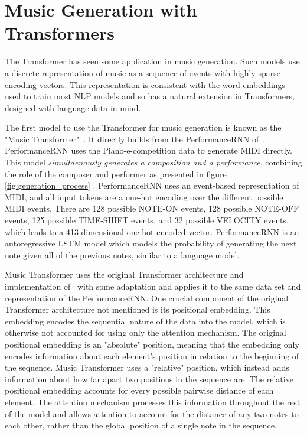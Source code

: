 
\section{Music Generation with Transformers}
The Transformer has seen some application in music generation. Such models use a discrete representation of music as a sequence of events with highly sparse encoding vectors. This representation is consistent with the word embeddings used to train most NLP models and so has a natural extension in Transformers, designed with language data in mind. 

The first model to use the Transformer for music generation is known as the "Music Transformer"~\cite{huang2018music}. It directly builds from the PerformanceRNN of~\citet{oore2020time}. PerformanceRNN uses the Piano-e-competition data to generate MIDI directly. This model \emph{simultaenously generates a composition and a performance}, combining the role of the composer and performer as presented in figure \ref{fig:generation_process} . PerformanceRNN uses an event-based representation of MIDI, and all input tokens are a one-hot encoding over the different possible MIDI events. There are 128 possible NOTE-ON events, 128 possible NOTE-OFF events, 125 possible TIME-SHIFT events, and 32 possible VELOCITY events, which leads to a 413-dimensional one-hot encoded vector. PerformanceRNN is an autoregressive LSTM model which models the probability of generating the next note given all of the previous notes, similar to a language model. 

Music Transformer uses the original Transformer architecture and implementation of~\citet{vaswani2017attention} with some adaptation and applies it to the same data set and representation of the PerformanceRNN. One crucial component of the original Transformer architecture not mentioned is its positional embedding. This embedding encodes the sequential nature of the data into the model, which is otherwise not accounted for using only the attention mechanism. The original positional embedding is an "absolute" position, meaning that the embedding only encodes information about each element's position in relation to the beginning of the sequence. Music Transformer uses a "relative" position, which instead adds information about how far apart two positions in the sequence are. The relative positional embedding accounts for every possible pairwise distance of each element. The attention mechanism processes this information throughout the rest of the model and allows attention to account for the distance of any two notes to each other, rather than the global position of a single note in the sequence. 

